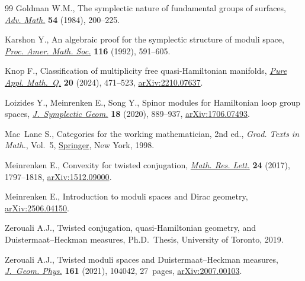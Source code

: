 \documentclass[10pt,a4paper]{amsart}
\numberwithin{equation}{section}
\theoremstyle{definition}
\begin{document}
\begin{thebibliography}{99}
Goldman W.M., The symplectic nature of fundamental groups of surfaces,
 \href{https://doi.org/10.1016/0001-8708(84)90040-9}{\textit{Adv. Math.}}
 \textbf{54} (1984), 200--225.

Karshon Y., An algebraic proof for the symplectic structure of moduli space,
 \href{https://doi.org/10.2307/2159424}{\textit{Proc. Amer. Math. Soc.}}
 \textbf{116} (1992), 591--605.

Knop F., Classification of multiplicity free quasi-{H}amiltonian manifolds,
 \href{https://doi.org/10.4310/pamq.2024.v20.n1.a10}{\textit{Pure Appl.
 Math.~Q.}} \textbf{20} (2024), 471--523,
 \href{https://arxiv.org/abs/2210.07637}{arXiv:2210.07637}.

Loizides Y., Meinrenken E., Song Y., Spinor modules for {H}amiltonian loop
 group spaces,
 \href{https://doi.org/10.4310/JSG.2020.v18.n3.a10}{\textit{J.~Symplectic
 Geom.}} \textbf{18} (2020), 889--937,
 \href{https://arxiv.org/abs/1706.07493}{arXiv:1706.07493}.

Mac~Lane S., Categories for the working mathematician, 2nd ed., \textit{Grad. Texts in
 Math.}, Vol.~5,
 \href{https://doi.org/10.1007/978-1-4757-4721-8}{Springer}, New York, 1998.


Meinrenken E., Convexity for twisted conjugation,
 \href{https://doi.org/10.4310/MRL.2017.v24.n6.a12}{\textit{Math. Res. Lett.}}
 \textbf{24} (2017), 1797--1818,
 \href{https://arxiv.org/abs/1512.09000}{arXiv:1512.09000}.

Meinrenken E., Introduction to moduli spaces and {D}irac geometry,
 \href{https://arxiv.org/abs/2506.04150}{arXiv:2506.04150}.

Zerouali A.J., Twisted conjugation, quasi-{H}amiltonian geometry, and
 {D}uistermaat--{H}eckman measures, Ph.D.~Thesis, {U}niversity of Toronto,
 2019.

Zerouali A.J., Twisted moduli spaces and {D}uistermaat--{H}eckman measures,
 \href{https://doi.org/10.1016/j.geomphys.2020.104042}{\textit{J.~Geom.
 Phys.}} \textbf{161} (2021), 104042, 27~pages,
 \href{https://arxiv.org/abs/2007.00103}{arXiv:2007.00103}.

\end{thebibliography} 
\end{document}
